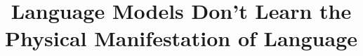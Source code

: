 \title{Language Models Don't Learn the Physical Manifestation of Language}

\begin{abstract}

\end{abstract}


